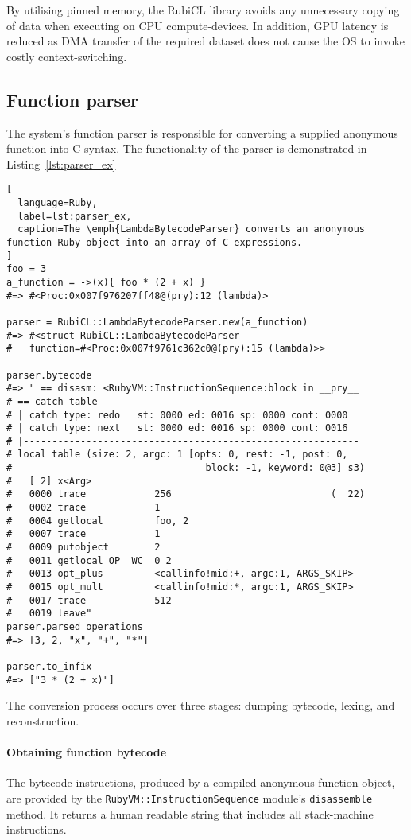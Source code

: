 By utilising pinned memory, the RubiCL library avoids any unnecessary copying of data when executing on \ac{CPU} compute-devices. In addition, \ac{GPU} latency is reduced as \ac{DMA} transfer of the required dataset does not cause the \ac{OS} to invoke costly context-switching.

\subsection{Function parser}
The system's function parser is responsible for converting a supplied anonymous function into C syntax. The functionality of the parser is demonstrated in Listing~\ref{lst:parser_ex}
\begin{lstlisting}[
  language=Ruby,
  label=lst:parser_ex,
  caption=The \emph{LambdaBytecodeParser} converts an anonymous function Ruby object into an array of C expressions.
]
foo = 3
a_function = ->(x){ foo * (2 + x) }
#=> #<Proc:0x007f976207ff48@(pry):12 (lambda)>

parser = RubiCL::LambdaBytecodeParser.new(a_function)
#=> #<struct RubiCL::LambdaBytecodeParser
#   function=#<Proc:0x007f9761c362c0@(pry):15 (lambda)>>

parser.bytecode
#=> " == disasm: <RubyVM::InstructionSequence:block in __pry__
# == catch table
# | catch type: redo   st: 0000 ed: 0016 sp: 0000 cont: 0000
# | catch type: next   st: 0000 ed: 0016 sp: 0000 cont: 0016
# |-----------------------------------------------------------
# local table (size: 2, argc: 1 [opts: 0, rest: -1, post: 0,
#                                  block: -1, keyword: 0@3] s3)
#   [ 2] x<Arg>     
#   0000 trace            256                            (  22)
#   0002 trace            1
#   0004 getlocal         foo, 2
#   0007 trace            1
#   0009 putobject        2
#   0011 getlocal_OP__WC__0 2
#   0013 opt_plus         <callinfo!mid:+, argc:1, ARGS_SKIP>
#   0015 opt_mult         <callinfo!mid:*, argc:1, ARGS_SKIP>
#   0017 trace            512
#   0019 leave"
parser.parsed_operations
#=> [3, 2, "x", "+", "*"]

parser.to_infix
#=> ["3 * (2 + x)"]
\end{lstlisting}

The conversion process occurs over three stages: dumping bytecode, lexing, and reconstruction.

\paragraph*{Obtaining function bytecode}
The bytecode instructions, produced by a compiled anonymous function object, are provided by the \verb|RubyVM::InstructionSequence| module's \verb|disassemble| method.
It returns a human readable string that includes all stack-machine instructions.

